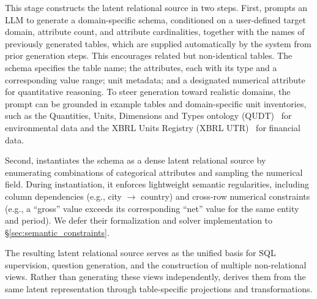 This stage constructs the latent relational source in two steps. First, \name prompts an LLM to generate a domain-specific schema, conditioned on a user-defined target domain, attribute count, and attribute cardinalities, together with the names of previously generated tables, which are supplied automatically by the system from prior generation steps. This encourages related but non-identical tables. The schema specifies the table name; the attributes, each with its type and a corresponding value range; unit metadata; and a designated numerical attribute for quantitative reasoning.
To steer generation toward realistic domains, the prompt can be grounded in example tables and domain-specific unit inventories, such as the Quantities, Units, Dimensions and Types ontology (QUDT)~\cite{qudt} for environmental data and the XBRL Units Registry (XBRL UTR)~\cite{xbrlutr} for financial data.

Second, \name instantiates the schema as a dense latent relational source by enumerating combinations of categorical attributes and sampling the numerical field. During instantiation, it enforces lightweight semantic regularities, including column dependencies (e.g., city $\longrightarrow$ country) and cross-row numerical constraints (e.g., a ``gross'' value exceeds its corresponding ``net'' value for the same entity and period). We defer their formalization and solver implementation to \S\ref{sec:semantic_constraints}. 

The resulting latent relational source serves as the unified basis for SQL supervision, question generation, and the construction of multiple non-relational views. Rather than generating these views independently, \name derives them from the same latent representation through table-specific projections and transformations. %

